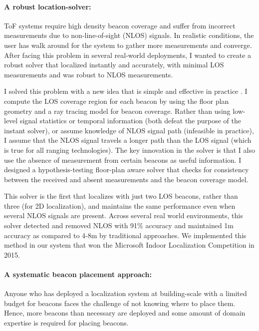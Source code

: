 \documentclass[10pt]{article}
\begin{document}
\paragraph{A robust location-solver: }
ToF systems require high density beacon coverage and suffer from incorrect measurements due to
non-line-of-sight (NLOS) signals. 
In realistic conditions, the user has walk around for the system to gather more measurements and converge. After facing this problem in several real-world deployments, I wanted to create a robust solver that localized instantly and accurately, with minimal LOS measurements and was robust to NLOS measurements. 

I solved this problem with a new idea that is simple and effective in practice \cite{rajagopal2018enhancing}. 
I compute the LOS coverage region for each beacon by using the floor plan geometry and a ray tracing model for beacon coverage. Rather than using low-level signal statistics or temporal information (both defeat the purpose of the instant solver), or assume knowledge of NLOS signal path (infeasible in practice), I assume that the NLOS signal travels a longer path than the LOS signal (which is true for all ranging technologies). The key innovation in the solver is that I also use the absence of measurement from certain beacons as useful information. I designed a hypothesis-testing floor-plan aware solver that checks for consistency between the received and absent measurements and the beacon coverage model.

This solver is the first that localizes with just two LOS beacons, rather than three (for 2D localization), and maintains the same performance even when several NLOS signals are present. Across several real
world environments, this solver detected and removed NLOS with 91\% accuracy and maintained 1m accuracy as compared to 4-8m by traditional approaches. We implemented this
method in our system that won the Microsoft Indoor
Localization Competition in 2015. 

\paragraph{A systematic beacon placement approach: }
Anyone who has deployed a localization system at building-scale with a limited budget for beacons faces the challenge of not knowing where to place them. %
Hence, more beacons than necessary are deployed and some amount of domain expertise is required for placing beacons. 
\end{document}
